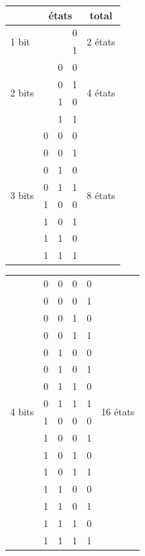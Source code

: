 \documentclass[11pt,a4paper]{article}
\begin{document}
\begin{table}[h!]
  \centering
  \begin{minipage}{0.45\textwidth}
    \centering

\begin{tabular}{ | m{2cm} | c c c | c | }
\hline
 & \multicolumn{3}{c|}{états} & total\\
\hline
\multirow{2}{*}[0pt]{1 bit} & & & 0 & \multirow{2}{*}[0pt]{2 états} \\
 & & & 1 & \\
\hline
\multirow{4}{*}[0pt]{2 bits} & & 0 & 0 & \multirow{4}{*}[0pt]{4 états} \\
 & & 0 & 1 & \\
 & & 1 & 0 & \\
 & & 1 & 1 & \\
\hline
\multirow{8}{*}[0pt]{3 bits} & 0 & 0 & 0 & \multirow{8}{*}[0pt]{8 états} \\
 & 0 & 0 & 1 & \\
 & 0 & 1 & 0 & \\
 & 0 & 1 & 1 & \\
 & 1 & 0 & 0 & \\
 & 1 & 0 & 1 & \\
 & 1 & 1 & 0 & \\
 & 1 & 1 & 1 & \\
\hline
\end{tabular}

  \end{minipage}
  \hfillx
  \begin{minipage}{0.45\textwidth}
    \centering

\begin{tabular}{ | m{2cm} | c c c c | c | }
\hline
\multirow{16}{*}[0pt]{4 bits} & 0 & 0 & 0 & 0 & \multirow{16}{*}[0pt]{16 états} \\
 & 0 & 0 & 0 & 1 & \\
 & 0 & 0 & 1 & 0 & \\
 & 0 & 0 & 1 & 1 & \\
 & 0 & 1 & 0 & 0 & \\
 & 0 & 1 & 0 & 1 & \\
 & 0 & 1 & 1 & 0 & \\
 & 0 & 1 & 1 & 1 & \\
 & 1 & 0 & 0 & 0 & \\
 & 1 & 0 & 0 & 1 & \\
 & 1 & 0 & 1 & 0 & \\
 & 1 & 0 & 1 & 1 & \\
 & 1 & 1 & 0 & 0 & \\
 & 1 & 1 & 0 & 1 & \\
 & 1 & 1 & 1 & 0 & \\
 & 1 & 1 & 1 & 1 & \\
\hline
\end{tabular}

  \end{minipage}
\end{table}
\end{document}
